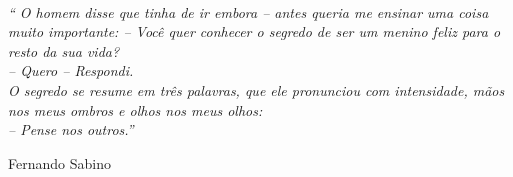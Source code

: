 \documentclass[a5paper,english,spanish,brazil]{ufsc-thesis}
\begin{document}
	\begin{agradecimentos}
	\begin{mdframed}[hidealllines=true,backgroundcolor=blue!20]
	\lipsum[1]
	\end{mdframed}
	\end{agradecimentos}

	\begin{epigrafe}
	    \vspace*{\fill}
			\noindent
			\hangindent=5cm \\
	  \textit{`` O homem disse que tinha de ir embora -- antes queria me ensinar uma coisa muito importante: -- Você quer conhecer o segredo de ser um menino feliz para o resto da sua vida? \\ -- Quero -- Respondi. \\ O segredo se resume em três palavras, que ele pronunciou com intensidade, mãos nos meus ombros e olhos nos meus olhos: \\ -- Pense nos outros.''}
	    \begin{flushright}
			Fernando Sabino	
			\end{flushright}		
	\end{epigrafe}





	 


	\listoffigures
	\cleardoublepage

	\listoftables*
	\cleardoublepage
\end{document}

